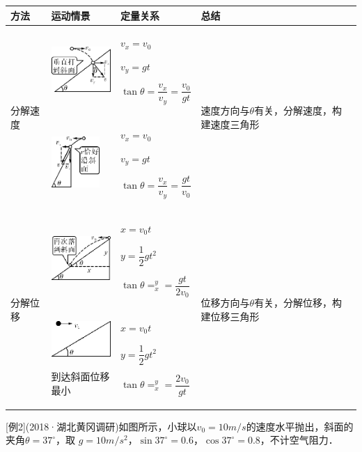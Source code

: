 \begin{longtable}[]{@{}m{2cm}m{3cm}m{3cm}m{5cm}@{}}
\toprule
方法 & 运动情景 & 定量关系 & 总结\tabularnewline
\midrule
\endhead
\multirow{2}{2cm}{分解速度}
&
\includegraphics[width=0.91667in,height=0.69792in]{media/image163.png}
&
$v_x=v_0$

$v_y=gt$

$\tan \theta=\dfrac{v_{x}}{v_{y}}=\dfrac{v_{0}}{g t}$
&
\multirow{2}{5cm}{速度方向与$\theta$有关，分解速度，构建速度三角形}

\tabularnewline
& 
\includegraphics[width=0.71875in,height=0.76042in]{media/image164.png}
&
$v_x=v_0$

$v_y=gt$

$\tan \theta=\dfrac{v_{x}}{v_{y}}=\dfrac{g t}{v_{0}}$

& \tabularnewline
\multirow{2}{2cm}{分解位移}
& 
\includegraphics[width=0.9375in,height=0.6875in]{media/image165.png}
&
$x=v_0t$

$y=\dfrac{1}{2} gt^2$

$\tan \theta=_{x}^{y}=\dfrac{g t}{2 v_{0}}$
& 
\multirow{2}{5cm}{位移方向与$\theta$有关，分解位移，构建位移三角形}
\tabularnewline
&
\includegraphics[width=0.90625in,height=0.54167in]{media/image166.png}

到达斜面位移最小
&
$x=v_0t$

$y=\dfrac{1}{2} gt^2$

$\tan \theta=_{x}^{y}=\dfrac{2 v_{0}}{g t}$
 & \tabularnewline
\bottomrule
\end{longtable}

{[}例2{]}(2018·湖北黄冈调研)如图所示，小球以$v_0=10m/s$的速度水平抛出，斜面的夹角$\theta=37^\circ$，取 $g=10m/s^2$，$\sin 37^\circ=0.6$，$\cos37^\circ=0.8$，不计空气阻力．

